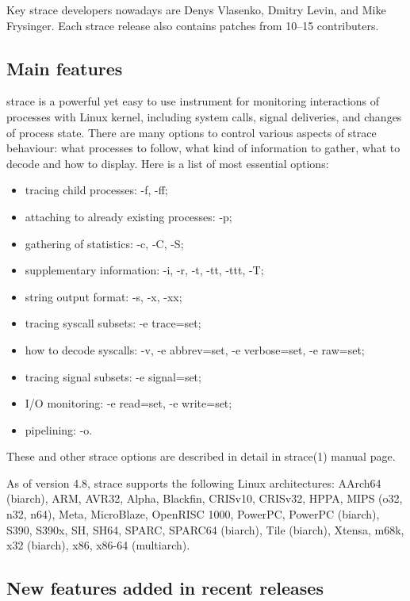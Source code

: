 \documentclass[10pt, a5paper]{article}
\begin{document}
Key strace developers nowadays are Denys Vlasenko, Dmitry Levin, and Mike Frysinger. Each strace release also contains patches from 10--15 contributers.

\subsection*{Main features}

strace is a powerful yet easy to use instrument for monitoring \linebreak interactions of processes with Linux kernel, including system calls, signal deliveries, and changes of process state.  There are many options to control various aspects of strace behaviour: what processes to follow, what kind of information to gather, what to decode and how to display.  Here is a list of most essential options:

\begin{itemize}
  \item tracing child processes: -f, -ff;
  \item attaching to already existing processes: -p;
  \item gathering of statistics: -c, -C, -S;
  \item supplementary information: -i, -r, -t, -tt, -ttt, -T;
  \item string output format: -s, -x, -xx;
  \item tracing syscall subsets: -e trace=set;
  \item how to decode syscalls: -v, -e abbrev=set, -e verbose=set, -e raw=set;
  \item tracing signal subsets: -e signal=set;
  \item I/O monitoring: -e read=set, -e write=set;
  \item pipelining: -o.
\end{itemize}

These and other strace options are described in detail in strace(1) manual page.

As of version 4.8, strace supports the following Linux architectures: AArch64 (biarch), ARM, AVR32, Alpha, Blackfin, CRISv10, CRISv32, HPPA, MIPS (o32, n32, n64), Meta, MicroBlaze, OpenRISC 1000, PowerPC, PowerPC (biarch), S390, S390x, SH, SH64, SPARC, \linebreak SPARC64 (biarch), Tile (biarch), Xtensa, m68k, x32 (biarch), x86, x86-64 (multiarch).

\subsection*{New features added in recent releases}
\end{document}
